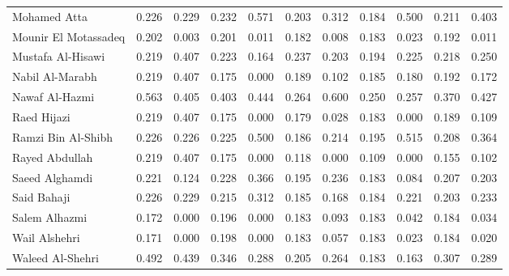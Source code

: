 \begin{subappendices}
\begin{table}
\begin{center}
\begin{tabular}{l cc cccccccc}
Mohamed Atta           & 0.226     & 0.229       & 0.232     & 0.571       & 0.203     & 0.312        & 0.184     & 0.500       & 0.211            & 0.403            \\
Mounir El Motassadeq   & 0.202     & 0.003       & 0.201     & 0.011       & 0.182     & 0.008        & 0.183     & 0.023       & 0.192            & 0.011              \\
Mustafa Al-Hisawi      & 0.219     & 0.407       & 0.223     & 0.164       & 0.237     & 0.203        & 0.194     & 0.225       & 0.218            & 0.250              \\
Nabil Al-Marabh        & 0.219     & 0.407       & 0.175     & 0.000       & 0.189     & 0.102        & 0.185     & 0.180       & 0.192            & 0.172             \\
Nawaf Al-Hazmi         & 0.563     & 0.405       & 0.403     & 0.444       & 0.264     & 0.600        & 0.250     & 0.257       & 0.370            & 0.427            \\
Raed Hijazi            & 0.219     & 0.407       & 0.175     & 0.000       & 0.179     & 0.028        & 0.183     & 0.000       & 0.189            & 0.109              \\
Ramzi Bin Al-Shibh     & 0.226     & 0.226       & 0.225     & 0.500       & 0.186     & 0.214        & 0.195     & 0.515       & 0.208            & 0.364              \\
Rayed Abdullah         & 0.219     & 0.407       & 0.175     & 0.000       & 0.118     & 0.000        & 0.109     & 0.000       & 0.155            & 0.102              \\
Saeed Alghamdi         & 0.221     & 0.124       & 0.228     & 0.366       & 0.195     & 0.236        & 0.183     & 0.084       & 0.207            & 0.203            \\
Said Bahaji            & 0.226     & 0.229       & 0.215     & 0.312       & 0.185     & 0.168        & 0.184     & 0.221       & 0.203            & 0.233             \\
Salem Alhazmi          & 0.172     & 0.000       & 0.196     & 0.000       & 0.183     & 0.093        & 0.183     & 0.042       & 0.184            & 0.034             \\
Wail Alshehri          & 0.171     & 0.000       & 0.198     & 0.000       & 0.183     & 0.057        & 0.183     & 0.023       & 0.184            & 0.020             \\
Waleed Al-Shehri       & 0.492     & 0.439       & 0.346     & 0.288       & 0.205     & 0.264        & 0.183     & 0.163       & 0.307            & 0.289            \\

\end{tabular}
\end{center}
\end{table}
\end{subappendices}
